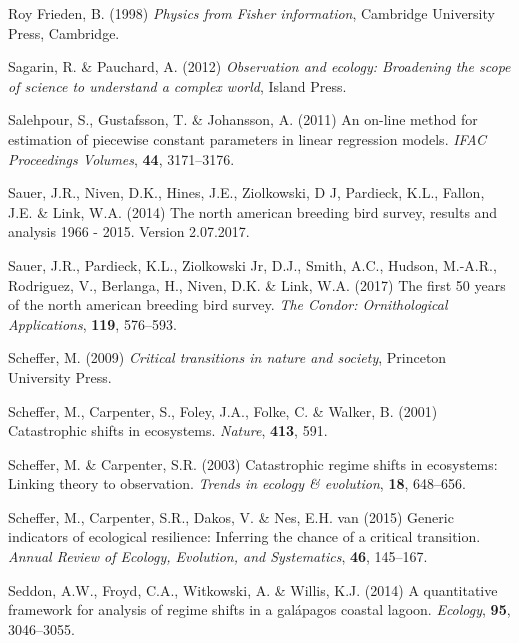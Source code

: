 \documentclass[print]{nuthesis}
\begin{document}
\leavevmode\hypertarget{ref-frieden_physics_1998}{}%
Roy Frieden, B. (1998) \emph{Physics from Fisher information}, Cambridge University Press, Cambridge.

\leavevmode\hypertarget{ref-sagarin_observation_2012}{}%
Sagarin, R. \& Pauchard, A. (2012) \emph{Observation and ecology: Broadening the scope of science to understand a complex world}, Island Press.

\leavevmode\hypertarget{ref-salehpour2011line}{}%
Salehpour, S., Gustafsson, T. \& Johansson, A. (2011) An on-line method for estimation of piecewise constant parameters in linear regression models. \emph{IFAC Proceedings Volumes}, \textbf{44}, 3171--3176.

\leavevmode\hypertarget{ref-sauer2017results}{}%
Sauer, J.R., Niven, D.K., Hines, J.E., Ziolkowski, D J, Pardieck, K.L., Fallon, J.E. \& Link, W.A. (2014) The north american breeding bird survey, results and analysis 1966 - 2015. Version 2.07.2017.

\leavevmode\hypertarget{ref-sauer2017first}{}%
Sauer, J.R., Pardieck, K.L., Ziolkowski Jr, D.J., Smith, A.C., Hudson, M.-A.R., Rodriguez, V., Berlanga, H., Niven, D.K. \& Link, W.A. (2017) The first 50 years of the north american breeding bird survey. \emph{The Condor: Ornithological Applications}, \textbf{119}, 576--593.

\leavevmode\hypertarget{ref-scheffer_critical_2009}{}%
Scheffer, M. (2009) \emph{Critical transitions in nature and society}, Princeton University Press.

\leavevmode\hypertarget{ref-scheffer_catastrophic_2001}{}%
Scheffer, M., Carpenter, S., Foley, J.A., Folke, C. \& Walker, B. (2001) Catastrophic shifts in ecosystems. \emph{Nature}, \textbf{413}, 591.

\leavevmode\hypertarget{ref-scheffer2003catastrophic}{}%
Scheffer, M. \& Carpenter, S.R. (2003) Catastrophic regime shifts in ecosystems: Linking theory to observation. \emph{Trends in ecology \& evolution}, \textbf{18}, 648--656.

\leavevmode\hypertarget{ref-scheffer2015generic}{}%
Scheffer, M., Carpenter, S.R., Dakos, V. \& Nes, E.H. van (2015) Generic indicators of ecological resilience: Inferring the chance of a critical transition. \emph{Annual Review of Ecology, Evolution, and Systematics}, \textbf{46}, 145--167.

\leavevmode\hypertarget{ref-seddon2014quantitative}{}%
Seddon, A.W., Froyd, C.A., Witkowski, A. \& Willis, K.J. (2014) A quantitative framework for analysis of regime shifts in a galápagos coastal lagoon. \emph{Ecology}, \textbf{95}, 3046--3055.
\end{document}
